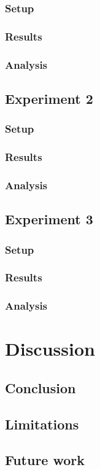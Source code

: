 \documentclass[UKenglish]{uiomasterthesis}
\begin{document}
\subsection{Setup}
\subsection{Results}
\subsection{Analysis}

\section{Experiment 2}
\subsection{Setup}
\subsection{Results}
\subsection{Analysis}

\section{Experiment 3}
\subsection{Setup}
\subsection{Results}
\subsection{Analysis}

\chapter{Discussion}

\section{Conclusion}

\section{Limitations}

\section{Future work}


\printbibliography{}
\end{document}
